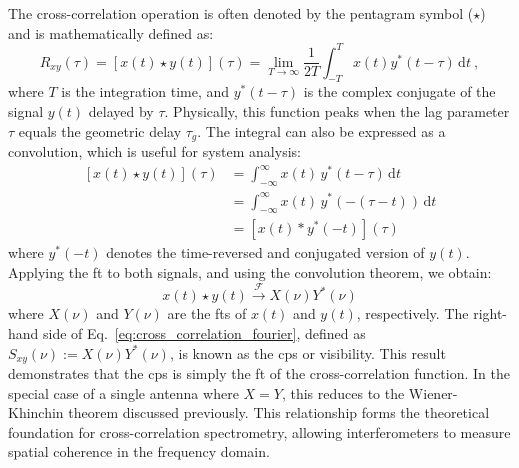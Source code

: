 The cross-correlation operation is often denoted by the pentagram symbol ($\star$) and is mathematically defined as:
\begin{equation}
    R_{xy}(\tau)=\left[x(t) \star y(t)\right](\tau) = \lim_{T \to \infty} \frac{1}{2T} \int_{-T}^{T} x(t) y^*(t - \tau) \, \mathrm{d}t \ ,
	\label{eq:cross_correlation_definition}
\end{equation}
where $T$ is the integration time, and $y^*(t - \tau)$ is the complex conjugate of the signal $y(t)$ delayed by $\tau$. Physically, this function peaks when the lag parameter $\tau$ equals the geometric delay $\tau_g$. The integral can also be expressed as a convolution, which is useful for system analysis:
\begin{align}
    \left[x(t) \star y(t)\right](\tau) 
    &= \int_{-\infty}^{\infty} x(t)\, y^*(t - \tau) \, \mathrm{d}t \\
    &= \int_{-\infty}^{\infty} x(t)\, y^*(-(\tau - t)) \, \mathrm{d}t \\
    &= \left[x(t) * y^*(-t)\right](\tau)
    \label{eq:cross_correlation}
\end{align}
where $y^*(-t)$ denotes the time-reversed and conjugated version of $y(t)$. Applying the \gls{ft} to both signals, and using the convolution theorem, we obtain:
\begin{equation}
    x(t) \star y(t) \xrightarrow{\mathcal{F}} X(\nu) Y^*(\nu)
    \label{eq:cross_correlation_fourier}
\end{equation}
where $X(\nu)$ and $Y(\nu)$ are the \glspl{ft} of $x(t)$ and $y(t)$, respectively. The right-hand side of Eq.\ \ref{eq:cross_correlation_fourier}, defined as $S_{xy}(\nu) := X(\nu) Y^*(\nu)$, is known as the \gls{cps} or visibility. This result demonstrates that the \gls{cps} is simply the \gls{ft} of the cross-correlation function. In the special case of a single antenna where $X = Y$, this reduces to the Wiener-Khinchin theorem discussed previously. This relationship forms the theoretical foundation for cross-correlation spectrometry, allowing interferometers to measure spatial coherence in the frequency domain.

